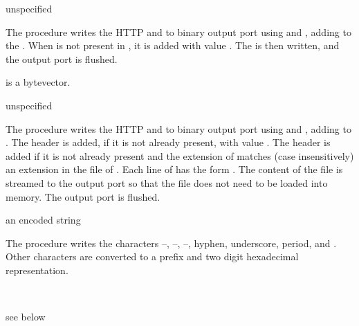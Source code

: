 \begin{procedure}
\end{procedure}
\returns{} unspecified

The  procedure writes the HTTP  and
 to binary output port  using
 and , adding
 to the . When
 is not present in , it is added
with value . The  is then written, and
the output port is flushed.

 is a bytevector.

\begin{procedure}
\end{procedure}
\returns{} unspecified

The  procedure writes the HTTP 
and  to binary output port  using
 and , adding
 to .  The 
header is added, if it is not already present, with value
. The  header is added if
it is not already present and the extension of  matches
(case insensitively) an extension in the  file of
. Each line of  has the form
. The content of
the file is streamed to the output port so that the file does not need
to be loaded into memory. The output port is flushed.

\begin{procedure}
\end{procedure}
\returns{} an encoded string

The  procedure writes the characters
--, --,
--, hyphen, underscore, period, and
\code{\~}. Other characters are converted to a \code{\%} prefix
and two digit hexadecimal representation.

\begin{procedure}
   \\
  \strut
\end{procedure}
\returns{} see below

